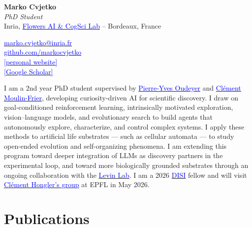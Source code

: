 \documentclass[a4paper]{article}
\begin{document}
\fontfamily{\sfdefault}
\selectfont

\begin{minipage}[t]{.5\textwidth}
{\LARGE \textbf{Marko Cvjetko}} \\[0.2em]
\textit{PhD Student}\\
Inria, \href{https://flowers.inria.fr/}{\textcolor{blue}{Flowers AI \& CogSci Lab}} -- Bordeaux, France
\end{minipage}%
\begin{minipage}[t]{.5\textwidth}
\raggedleft
\href{mailto:marko.cvjetko@inria.fr}{\textcolor{blue}{marko.cvjetko@inria.fr}} \\
\href{https://github.com/markocvjetko}{\textcolor{blue}{github.com/markocvjetko}} \\
\href{https://markocvjetko.github.io/}{\textcolor{blue}{[personal website]}} \\
\href{https://scholar.google.co.uk/citations?hl=hr&user=WDyIW9QAAAAJ}{\textcolor{blue}{[Google Scholar]}}
\end{minipage}

\vspace{1em}

I am a 2nd year PhD student supervised by \href{http://www.pyoudeyer.com/}{\textcolor{blue}{Pierre-Yves Oudeyer}} and \href{https://clement-moulin-frier.github.io/}{\textcolor{blue}{Cl\'{e}ment Moulin-Frier}}, developing curiosity-driven AI for scientific discovery. I draw on goal-conditioned reinforcement learning, intrinsically motivated exploration, vision--language models, and evolutionary search to build agents that autonomously explore, characterize, and control complex systems. I apply these methods to artificial life substrates --- such as cellular automata --- to study open-ended evolution and self-organizing phenomena. I am extending this program toward deeper integration of LLMs as discovery partners in the experimental loop, and toward more biologically grounded substrates through an ongoing collaboration with the \href{https://drmichaellevin.org/}{\textcolor{blue}{Levin Lab}}. I am a 2026 \href{https://disi.org/}{\textcolor{blue}{DISI}} fellow and will visit \href{https://www.epfl.ch/labs/csft/}{\textcolor{blue}{Cl\'{e}ment Hongler's group}} at EPFL in May 2026.
\vspace{0.4em}


\section{Publications}
\end{document}
